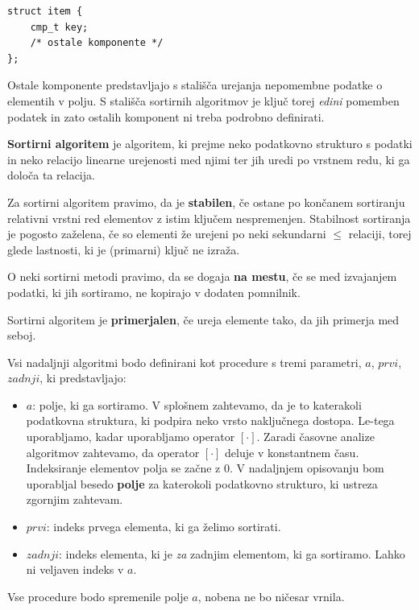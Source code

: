 \documentclass[a4paper,oneside,12pt]{article}
\begin{document}
\begin{lstlisting}
struct item {
    cmp_t key;
    /* ostale komponente */
};
\end{lstlisting}

Ostale komponente predstavljajo s stališča urejanja nepomembne podatke o elementih v
polju.
S stališča sortirnih algoritmov je ključ torej \emph{edini} pomemben podatek in zato
ostalih komponent ni treba podrobno definirati.

\begin{definicija}
  \textbf{Sortirni algoritem} je algoritem, ki prejme neko podatkovno strukturo s podatki
  in neko relacijo linearne urejenosti med njimi ter jih uredi po vrstnem redu, ki ga določa ta
  relacija.
\end{definicija}

\begin{definicija}
  Za sortirni algoritem pravimo, da je \textbf{stabilen}, če ostane po končanem sortiranju
  relativni vrstni red elementov z istim ključem nespremenjen.
  Stabilnost sortiranja je pogosto zaželena, če so elementi že urejeni po neki
  sekundarni $\leq$ relaciji, torej glede lastnosti, ki je (primarni) ključ ne izraža.
\end{definicija}

\begin{definicija}
  O neki sortirni metodi pravimo, da se dogaja \textbf{na mestu}, če se med izvajanjem podatki, ki
  jih sortiramo, ne kopirajo v dodaten pomnilnik.
\end{definicija}

\begin{definicija}
  Sortirni algoritem je \textbf{primerjalen}, če ureja elemente tako, da jih primerja med seboj.
\end{definicija}


Vsi nadaljnji algoritmi bodo definirani kot procedure s tremi parametri, $a$, $prvi$,
$zadnji$, ki predstavljajo:
\begin{itemize}
  \item $a$: polje, ki ga sortiramo. V splošnem zahtevamo, da je to katerakoli podatkovna
    struktura, ki podpira neko vrsto naključnega dostopa. Le-tega uporabljamo, kadar 
    uporabljamo operator $[\cdot]$. Zaradi časovne analize algoritmov zahtevamo, da operator 
    $[\cdot]$ deluje v konstantnem času. Indeksiranje elementov polja se začne z 0.
    V nadaljnjem opisovanju bom uporabljal besedo
    \textbf{polje} za katerokoli podatkovno strukturo, ki ustreza zgornjim zahtevam.
  \item $prvi$: indeks prvega elementa, ki ga želimo sortirati.
  \item $zadnji$: indeks elementa, ki je \emph{za} zadnjim elementom, ki ga sortiramo. Lahko ni
    veljaven indeks v $a$.
\end{itemize}
Vse procedure bodo spremenile polje $a$, nobena ne bo ničesar vrnila.
\end{document}
